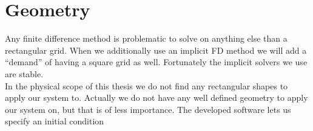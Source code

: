 \section{Geometry}
Any finite difference method is problematic to solve on anything else than a rectangular grid. 
When we additionally use an implicit FD method we will add a ``demand'' of having a square grid as well. 
Fortunately the implicit solvers we use are stable. \\
In the physical scope of this thesis we do not find any rectangular shapes to apply our system to. 
Actually we do not have any well defined geometry to apply our system on, but that is of less importance. 
The developed software lets us specify an initial condition